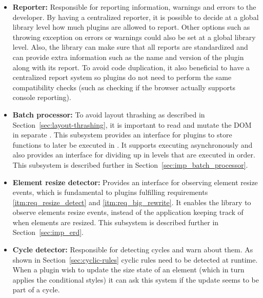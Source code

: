 \documentclass[a4paper,11pt]{kth-mag}
\begin{document}
      \begin{itemize}
        \item \textbf{Reporter:}
          Responsible for reporting information, warnings and errors to the developer.
          By having a centralized reporter, it is possible to decide at a global library level how much plugins are allowed to report.
          Other options such as throwing exception on errors or warnings could also be set at a global library level.
          Also, the library can make sure that all reports are standardized and can provide extra information such as the name and version of the plugin along with its report.
          To avoid code duplication, it also beneficial to have a centralized report system so plugins do not need to perform the same compatibility checks (such as checking if the \gls{browser} actually supports console reporting).
        \item \textbf{Batch processor:}
          To avoid \gls{layout thrashing} as described in Section~\ref{sec:layout-thrashing}, it is important to read and mutate the \gls{DOM} in separate .
          This subsystem provides an interface for plugins to store functions to later be executed in .
          It supports executing  asynchronously and also provides an interface for dividing  up in levels that are executed in order.
          This subsystem is described further in Section~\ref{sec:imp_batch_processor}.
        \item \textbf{Element resize detector:}
          Provides an interface for observing \gls{element} resize events, which is fundamental to plugins fulfilling requirements \ref{itm:req_resize_detect} and \ref{itm:req_big_rewrite}.
          It enables the library to observe \glspl{element} resize events, instead of the application keeping track of when \glspl{element} are resized.
          This subsystem is described further in Section~\ref{sec:imp_erd}.
        \item \textbf{Cycle detector:}
          Responsible for detecting cycles and warn about them.
          As shown in Section~\ref{sec:cyclic-rules} cyclic rules need to be detected at runtime.
          When a plugin wish to update the size state of an \gls{element} (which in turn applies the conditional styles) it can ask this system if the update seems to be part of a cycle.

\end{itemize}
\end{document}
